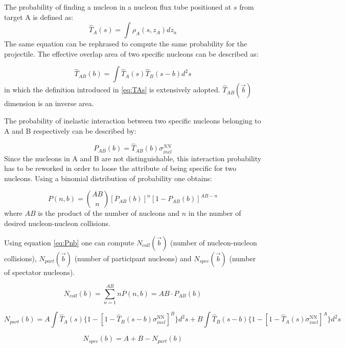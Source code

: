 The probability of finding a nucleon in a nucleon flux tube positioned at $s$ from target A is defined as:
\begin{equation}
\label{eq:TAs}
\hat{T}_A(s) = \int{\rho}_A(s,z_A)dz_a
\end{equation}
The same equation can be rephrased to compute the same probability for the projectile.
The effective overlap area of two specific nucleons can be described as:

\begin{equation}
\label{eq:TAB}
\hat{T}_{AB}(b) = \int\hat{T}_A(s)\hat{T}_B(s-b)d^2s
\end{equation}
in which the definition introduced in \ref{eq:TAs} is extensively adopted.
$\hat{T}_{AB}(\vec{b})$ dimension is an inverse area.

The probability of inelastic interaction between two specific nucleons belonging to A and B respectively can be described by:

\begin{equation}
\label{eq:PAB}
P_{AB}(b)=\hat{T}_{AB}(b)\sigma_{inel}^{NN}
\end{equation}
Since the nucleons in A and B are not distinguishable, this interaction probability has to be reworked in order to loose the attribute of being specific for two nucleons.
Using a binomial distribution of probability one obtains:

\begin{equation}
\label{eq:Pnb}
P(n,b)=\binom{AB}{n}[P_{AB}(b)]^n[1-P_{AB}(b)]^{AB-n}
\end{equation}
where $AB$ is the product of the number of nucleons and $n$ in the number of desired nucleon-nucleon collisions.

Using equation \ref{eq:Pnb} one can compute $N_{coll}(\vec{b})$ (number of nucleon-nucleon collisions), $N_{part}(\vec{b})$ (number of participant nucleons) and $N_{spec}(\vec{b})$ (number of spectator nucleons).

\begin{equation}
\label{eq:Ncoll}
N_{coll}(b)=\sum_{n=1}^{AB}nP(n,b)=AB\cdot P_{AB}(b)
\end{equation}

\begin{equation}
\label{eq:Npart}
N_{part}(b)=A\int\hat{T}_A(s)\{1-[1-\hat{T}_B(s-b)\sigma_{inel}^{\mathrm{NN}}]^B\}d^2s + B\int\hat{T}_B(s-b)\{1-[1-\hat{T}_A(s)\sigma_{inel}^{\mathrm{NN}}]^A\}d^2s
\end{equation}

\begin{equation}
\label{eq:Nspec}
N_{spec}(b)=A+B-N_{part}(b)
\end{equation}

